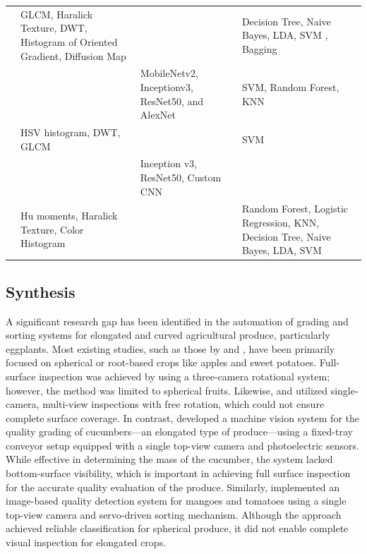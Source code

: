 {\begin{table}
\begin{tabular}{
			>{\centering\arraybackslash}m{2.5cm} 
			>{\centering\arraybackslash}m{5cm}   
			>{\centering\arraybackslash}m{4.5cm} 
			>{\centering\arraybackslash}m{7cm}   
		}
		\citet{Wang2024} &
		GLCM, Haralick Texture, DWT, Histogram of Oriented Gradient, Diffusion Map &
		&
		Decision Tree, Naive Bayes,  LDA, SVM , Bagging \\
		
		\citet{Mputu2024} &
		&
		MobileNetv2, Inceptionv3, ResNet50, and AlexNet &
		SVM, Random Forest, KNN \\
		
		\citet{Chandra2024} &
		HSV histogram, DWT, GLCM &
		&
		SVM \\
		
		\citet{Azadnia2023} &
		&
		Inception v3, ResNet50, Custom CNN &
		\\
		
		\citet{Iqbal2020} &
		Hu moments, Haralick Texture, Color Histogram &
		&
		Random Forest, Logistic Regression, KNN, Decision Tree, Naive Bayes, LDA, SVM \\
		
		\bottomrule
	\end{tabular}
\end{table}

\newpage

\subsection{Synthesis}
A significant research gap has been identified in the automation of grading and sorting systems for elongated and curved agricultural produce, particularly eggplants. Most existing studies, such as those by \citep{xu2024design} and \citep{bu2025grading}, have been primarily focused on spherical or root-based crops like apples and sweet potatoes. Full-surface inspection was achieved by \citep{lee2023multi} using a three-camera rotational system; however, the method was limited to spherical fruits. Likewise, \citep{bu2025grading} and \citep{xu2024design} utilized single-camera, multi-view inspections with free rotation, which could not ensure complete surface coverage. In contrast, \citep{liu2024design} developed a machine vision system for the quality grading of cucumbers—an elongated type of produce—using a fixed-tray conveyor setup equipped with a single top-view camera and photoelectric sensors. While effective in determining the mass of the cucumber, the system lacked bottom-surface visibility, which is important in achieving full surface inspection for the accurate quality evaluation of the produce. Similarly, \citep{amna2023machine} implemented an image-based quality detection system for mangoes and tomatoes using a single top-view camera and servo-driven sorting mechanism. Although the approach achieved reliable classification for spherical produce, it did not enable complete visual inspection for elongated crops. 

}
